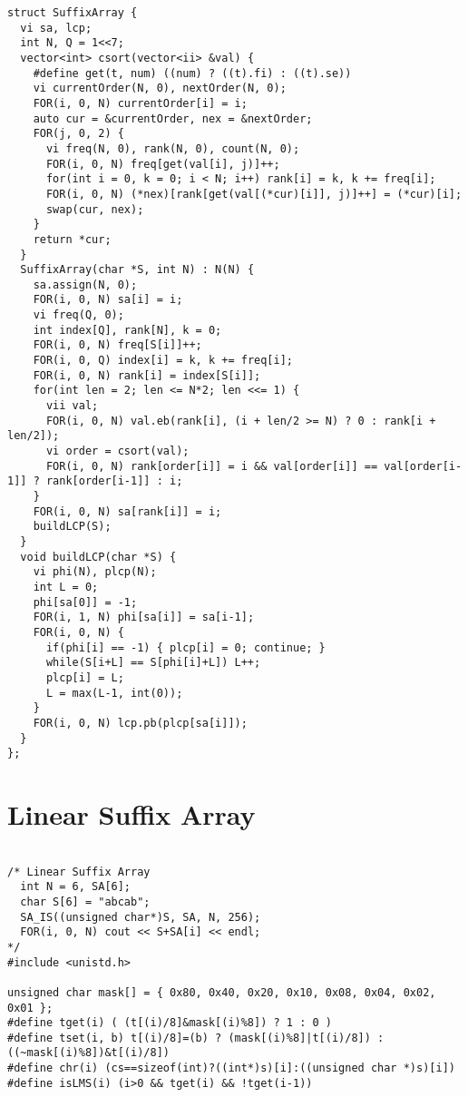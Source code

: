 \documentclass[8pt, oneside]{extarticle}
\begin{document}
\begin{multicols}{3}
\begin{lstlisting}
struct SuffixArray {
  vi sa, lcp;
  int N, Q = 1<<7;
  vector<int> csort(vector<ii> &val) {
    #define get(t, num) ((num) ? ((t).fi) : ((t).se))
    vi currentOrder(N, 0), nextOrder(N, 0);
    FOR(i, 0, N) currentOrder[i] = i;
    auto cur = &currentOrder, nex = &nextOrder;
    FOR(j, 0, 2) {
      vi freq(N, 0), rank(N, 0), count(N, 0);
      FOR(i, 0, N) freq[get(val[i], j)]++;
      for(int i = 0, k = 0; i < N; i++) rank[i] = k, k += freq[i];  
      FOR(i, 0, N) (*nex)[rank[get(val[(*cur)[i]], j)]++] = (*cur)[i];
      swap(cur, nex);
    }
    return *cur;
  }
  SuffixArray(char *S, int N) : N(N) {
    sa.assign(N, 0);
    FOR(i, 0, N) sa[i] = i;
    vi freq(Q, 0);
    int index[Q], rank[N], k = 0;
    FOR(i, 0, N) freq[S[i]]++;
    FOR(i, 0, Q) index[i] = k, k += freq[i];
    FOR(i, 0, N) rank[i] = index[S[i]];
    for(int len = 2; len <= N*2; len <<= 1) {
      vii val;
      FOR(i, 0, N) val.eb(rank[i], (i + len/2 >= N) ? 0 : rank[i + len/2]);
      vi order = csort(val);
      FOR(i, 0, N) rank[order[i]] = i && val[order[i]] == val[order[i-1]] ? rank[order[i-1]] : i;
    }
    FOR(i, 0, N) sa[rank[i]] = i;
    buildLCP(S);
  }
  void buildLCP(char *S) {
    vi phi(N), plcp(N);
    int L = 0;
    phi[sa[0]] = -1;
    FOR(i, 1, N) phi[sa[i]] = sa[i-1];
    FOR(i, 0, N) {
      if(phi[i] == -1) { plcp[i] = 0; continue; }
      while(S[i+L] == S[phi[i]+L]) L++;
      plcp[i] = L;
      L = max(L-1, int(0));
    }
    FOR(i, 0, N) lcp.pb(plcp[sa[i]]);
  }
};
\end{lstlisting}

\section{Linear Suffix Array}

\begin{lstlisting}

/* Linear Suffix Array
  int N = 6, SA[6];
  char S[6] = "abcab";
  SA_IS((unsigned char*)S, SA, N, 256);
  FOR(i, 0, N) cout << S+SA[i] << endl;
*/
#include <unistd.h>

unsigned char mask[] = { 0x80, 0x40, 0x20, 0x10, 0x08, 0x04, 0x02, 0x01 };
#define tget(i) ( (t[(i)/8]&mask[(i)%8]) ? 1 : 0 )
#define tset(i, b) t[(i)/8]=(b) ? (mask[(i)%8]|t[(i)/8]) : ((~mask[(i)%8])&t[(i)/8])
#define chr(i) (cs==sizeof(int)?((int*)s)[i]:((unsigned char *)s)[i])
#define isLMS(i) (i>0 && tget(i) && !tget(i-1))


\end{lstlisting}
\end{multicols}
\end{document}
